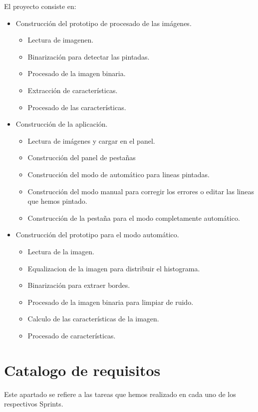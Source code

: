El proyecto consiste en:
\begin{itemize}
	\item Construcción del prototipo de procesado de las imágenes.
		\begin{itemize}
			\item Lectura de imagenen.
			\item Binarización para detectar las pintadas.
			\item Procesado de la imagen binaria.
			\item Extracción de características.
			\item Procesado de las características.
		\end{itemize}
	\item Construcción de la aplicación.
		\begin{itemize}
			\item Lectura de imágenes y cargar en el panel.
			\item Construcción del panel de pestañas
			\item Construcción del modo de automático para lineas pintadas.
			\item Construcción del modo manual para corregir los errores o editar las lineas que hemos pintado.
			\item Construcción de la pestaña para el modo completamente automático.			
		\end{itemize}
	\item Construcción del prototipo para el modo automático.
		\begin{itemize}
			\item Lectura de la imagen.
			\item Equalizacion de la imagen para distribuir el histograma.
			\item Binarización para extraer bordes.
			\item Procesado de la imagen binaria para limpiar de ruido.
			\item Calculo de las características de la imagen.
			\item Procesado de características.		
		\end{itemize}
\end{itemize}




\section{Catalogo de requisitos}
Este apartado se refiere a las tareas que hemos realizado en cada uno de los respectivos Sprints.

